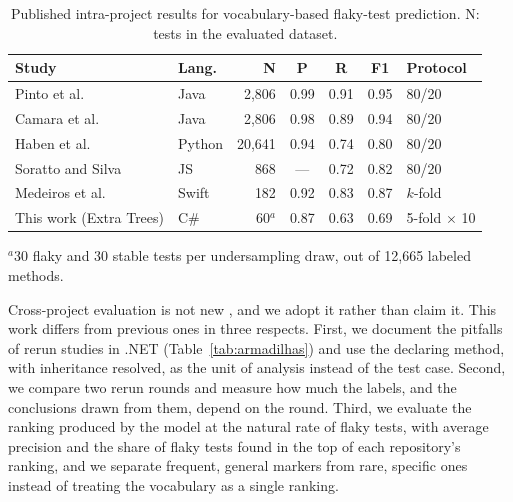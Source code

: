 \begin{table}[!htbp]
\caption{Published intra-project results for vocabulary-based flaky-test prediction. N: tests in the evaluated dataset.}
\label{tab:literatura}
\centering
\footnotesize
\setlength{\tabcolsep}{3pt}
\begin{tabular}{@{}llrcccl@{}}
\toprule
\textbf{Study} & \textbf{Lang.} & \textbf{N} & \textbf{P} & \textbf{R} & \textbf{F1} & \textbf{Protocol} \\
\midrule
Pinto et al.~\cite{pinto2020vocabulary} & Java & 2,806 & 0.99 & 0.91 & 0.95 & 80/20 \\
Camara et al.~\cite{camara2021revisiting} & Java & 2,806 & 0.98 & 0.89 & 0.94 & 80/20 \\
Haben et al.~\cite{haben2021replication} & Python & 20,641 & 0.94 & 0.74 & 0.80 & 80/20 \\
Soratto and Silva~\cite{soratto2023vocabulary} & JS & 868 & --- & 0.72 & 0.82 & 80/20 \\
Medeiros et al.~\cite{medeiros2026vocabulary} & Swift & 182 & 0.92 & 0.83 & 0.87 & $k$-fold \\
\midrule
This work (Extra Trees) & C\# & 60$^{a}$ & 0.87 & 0.63 & 0.69 & 5-fold $\times$ 10 \\
\bottomrule
\end{tabular}

\vspace{0.2em}
\raggedright\footnotesize $^{a}$30 flaky and 30 stable tests per undersampling draw, out of 12,665 labeled methods.
\end{table}

 Cross-project evaluation is not new \cite{camara2021revisiting, soratto2023vocabulary, gultekin2026limits}, and we adopt it rather than claim it. This work differs from previous ones in three respects. First, we document the pitfalls of rerun studies in .NET (Table~\ref{tab:armadilhas}) and use the declaring method, with inheritance resolved, as the unit of analysis instead of the test case. Second, we compare two rerun rounds and measure how much the labels, and the conclusions drawn from them, depend on the round. Third, we evaluate the ranking produced by the model at the natural rate of flaky tests, with average precision and the share of flaky tests found in the top of each repository's ranking, and we separate frequent, general markers from rare, specific ones instead of treating the vocabulary as a single ranking. 

